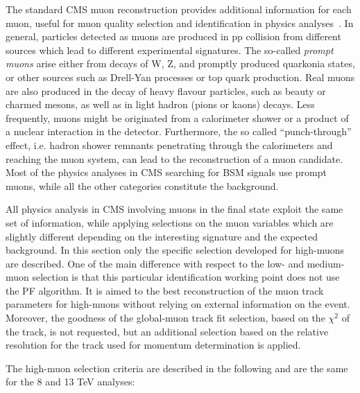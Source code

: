 The standard CMS muon reconstruction provides additional information for each muon, useful for muon quality selection and identification in physics analyses~\cite{Chatrchyan:2012xi}. 
In general, particles detected as muons are produced in pp collision from different sources which lead to different experimental signatures. The so-called {\it prompt muons} arise either from decays of W, Z, and promptly produced quarkonia states, or other sources such as Drell-Yan processes or top quark production. Real muons are also produced in the decay of heavy flavour particles, such as beauty or charmed mesons, as well as in light hadron (pions or kaons) decays. Less frequently, muons might be originated from a calorimeter shower or a product of a nuclear interaction in the detector. Furthermore, the so called ``punch-through'' effect, i.e. hadron shower remnants penetrating through the calorimeters and reaching the muon system, can lead to the reconstruction of a muon candidate. Most of the physics analyses in CMS searching for BSM signals use prompt muons, while all the other categories constitute the background.

All physics analysis in CMS involving muons in the final state exploit the same set of information, while applying selections on the muon variables which are slightly different depending on the interesting signature and the expected background. In this section only the specific selection developed for high-\pt muons are described. One of the main difference with respect to the low- and medium-\pt muon selection is that this particular identification working point does not use the PF algorithm. It is aimed to the best reconstruction of the muon track parameters for high-\pt muons without relying on external information on the event. Moreover, the goodness of the global-muon track fit selection, based on the $\chi^2$ of the track, is not requested, but an additional selection based on the relative \pt resolution for the track used for momentum determination is applied. 

The high-\pt muon selection criteria are described in the following and are the same for the 8 and 13 TeV analyses:

